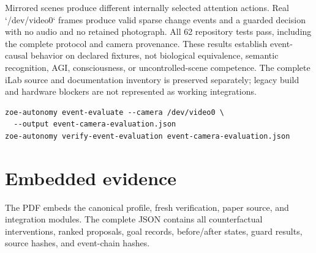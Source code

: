 \documentclass[11pt,a4paper]{article}
\begin{document}
Mirrored scenes produce different internally selected attention actions. Real `/dev/video0` frames produce valid sparse change events and a guarded decision with no audio and no retained photograph. All 62 repository tests pass, including the complete protocol and camera provenance. These results establish event-causal behavior on declared fixtures, not biological equivalence, semantic recognition, AGI, consciousness, or uncontrolled-scene competence. The complete iLab source and documentation inventory is preserved separately; legacy build and hardware blockers are not represented as working integrations.

\begin{lstlisting}
zoe-autonomy event-evaluate --camera /dev/video0 \
  --output event-camera-evaluation.json
zoe-autonomy verify-event-evaluation event-camera-evaluation.json
\end{lstlisting}


\section{Embedded evidence}
The PDF embeds the canonical profile, fresh verification, paper source, and integration modules. The complete JSON contains all counterfactual interventions, ranked proposals, goal records, before/after states, guard results, source hashes, and event-chain hashes.

\end{document}
